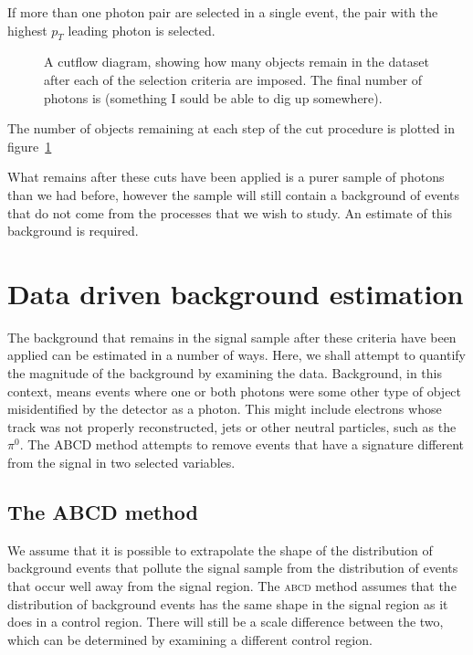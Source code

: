 If more than one photon pair are selected in a single event, the pair with the highest $p_T$ leading photon is selected.

\begin{figure}[htp]
\begin{minipage}[b]{.69\textwidth}
\begin{infilsf} \tiny

\end{infilsf}
\end{minipage}\hfill\begin{minipage}[b]{.3\textwidth}
\caption{A cutflow diagram, showing how many objects remain in the dataset after each of the selection criteria are imposed. The final number of photons is (something I sould be able to dig up somewhere).
\label{cutflow}}
\end{minipage}
\end{figure}

The number of objects remaining at each step of the cut procedure is plotted in figure~\ref{cutflow}

What remains after these cuts have been applied is a purer sample of photons than we had before, however the sample will still contain a background of events that do not come from the processes that we wish to study. An estimate of this background is required.

\section{Data driven background estimation}
The background that remains in the signal sample after these criteria have been applied can be estimated in a number of ways. Here, we shall attempt to quantify the magnitude of the background by examining the data. Background, in this context, means events where one or both photons were some other type of object misidentified by the detector as a photon. This might include electrons whose track was not properly reconstructed, jets or other neutral particles, such as the $\pi^0$. The ABCD method attempts to remove events that have a signature different from the signal in two selected variables.

\subsection{The ABCD method}
We assume that it is possible to extrapolate the shape of the distribution of background events that pollute the signal sample from the distribution of events that occur well away from the signal region. The \textsc{abcd} method assumes that the distribution of background events has the same shape in the signal region as it does in a control region. There will still be a scale difference between the two, which can be determined by examining a different control region.

